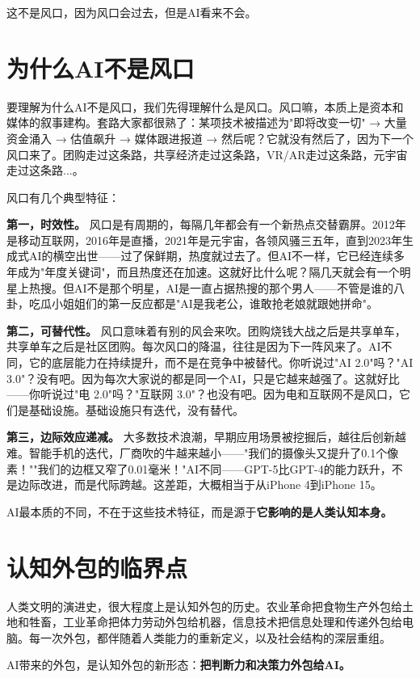 这不是风口，因为风口会过去，但是AI看来不会。


\section{为什么AI不是风口}


要理解为什么AI不是风口，我们先得理解什么是风口。风口嘛，本质上是资本和媒体的叙事建构。套路大家都很熟了：某项技术被描述为"即将改变一切" → 大量资金涌入 → 估值飙升 → 媒体跟进报道 → 然后呢？它就没有然后了，因为下一个风口来了。团购走过这条路，共享经济走过这条路，VR/AR走过这条路，元宇宙走过这条路...。

风口有几个典型特征：

\textbf{第一，时效性。} 风口是有周期的，每隔几年都会有一个新热点交替霸屏。2012年是移动互联网，2016年是直播，2021年是元宇宙，各领风骚三五年，直到2023年生成式AI的横空出世——过了保鲜期，热度就过去了。但AI不一样，它已经连续多年成为"年度关键词"，而且热度还在加速。这就好比什么呢？隔几天就会有一个明星上热搜。但AI不是那个明星，AI是一直占据热搜的那个男人——不管是谁的八卦，吃瓜小姐姐们的第一反应都是"AI是我老公，谁敢抢老娘就跟她拼命"。

\textbf{第二，可替代性。} 风口意味着有别的风会来吹。团购烧钱大战之后是共享单车，共享单车之后是社区团购。每次风口的降温，往往是因为下一阵风来了。AI不同，它的底层能力在持续提升，而不是在竞争中被替代。你听说过"AI 2.0"吗？"AI 3.0"？没有吧。因为每次大家说的都是同一个AI，只是它越来越强了。这就好比——你听说过"电 2.0"吗？"互联网 3.0"？也没有吧。因为电和互联网不是风口，它们是基础设施。基础设施只有迭代，没有替代。

\textbf{第三，边际效应递减。} 大多数技术浪潮，早期应用场景被挖掘后，越往后创新越难。智能手机的迭代，厂商吹的牛越来越小——"我们的摄像头又提升了0.1个像素！""我们的边框又窄了0.01毫米！"AI不同——GPT-5比GPT-4的能力跃升，不是边际改进，而是代际跨越。这差距，大概相当于从iPhone 4到iPhone 15。

AI最本质的不同，不在于这些技术特征，而是源于\textbf{它影响的是人类认知本身。}


\section{认知外包的临界点}


人类文明的演进史，很大程度上是认知外包的历史。农业革命把食物生产外包给土地和牲畜，工业革命把体力劳动外包给机器，信息技术把信息处理和传递外包给电脑。每一次外包，都伴随着人类能力的重新定义，以及社会结构的深层重组。

AI带来的外包，是认知外包的新形态：\textbf{把判断力和决策力外包给AI。}

